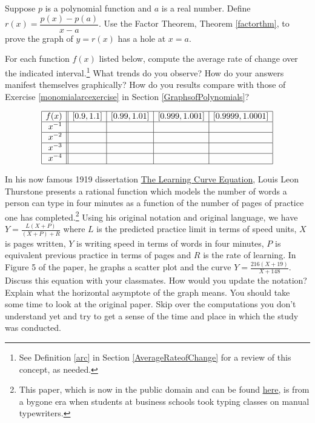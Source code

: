 \documentclass{ximera}
\begin{document}
\begin{problem}
Suppose $p$ is a polynomial function and $a$ is a real number.  Define $r(x)= \dfrac{p(x) - p(a)}{x-a}$.  Use the Factor Theorem, Theorem \ref{factorthm}, to prove the graph of $y = r(x)$ has a hole at $x =a$.
\end{problem}

\begin{problem}\label{laurentarcexercise}
For each function $f(x)$ listed below, compute the average rate of change over the indicated interval.\footnote{See Definition \ref{arc} in Section \ref{AverageRateofChange} for a review of this concept, as needed.}  What trends do you observe?  How do your answers manifest themselves graphically?  How do you results compare with those of Exercise \ref{monomialarcexercise} in Section \ref{GraphsofPolynomials}?

\vspace*{-0.2in}

\[ \begin{array}{|r||c|c|c|c|}  \hline

 f(x) &  [0.9, 1.1] & [0.99, 1.01] &[0.999, 1.001] & [0.9999, 1.0001]  \\ \hline
 x^{-1} &&&&   \\  \hline
 x^{-2} &&&&    \\  \hline
 x^{-3} &&&&   \\  \hline
 x^{-4} &&&&   \\  \hline
\end{array} \]
\end{problem}

\begin{problem}
  In his now famous 1919 dissertation \underline{The Learning Curve Equation}, Louis Leon Thurstone presents a rational function which models the number of words a person can type in four minutes as a function of the number of pages of practice one has completed.\footnote{This paper, which is now in the public domain and can be found  \href{http://bit.ly/2uNaUBa}{\underline{here}}, is from a bygone era when students at business schools took typing classes on manual typewriters.} Using his original notation and original language, we have $Y = \frac{L(X + P)}{(X + P) + R}$ where $L$ is the predicted practice limit in terms of speed units, $X$ is pages written, $Y$ is writing speed in terms of words in four minutes, $P$ is equivalent previous practice in terms of pages and $R$ is the rate of learning. In Figure 5 of the paper, he graphs a scatter plot and the curve $Y = \frac{216(X + 19)}{X + 148}$.  Discuss this equation with your classmates.  How would you update the notation?  Explain what the horizontal asymptote of the graph means.  You should take some time to look at the original paper. Skip over the computations you don't understand yet and try to get a sense of the time and place in which the study was conducted.
\end{problem}
\end{document}
